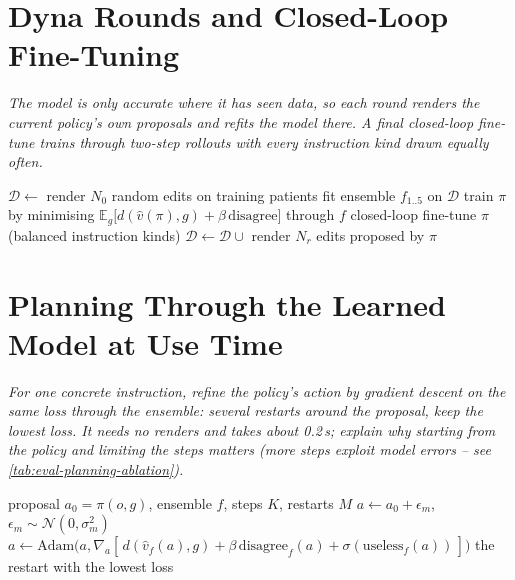 \documentclass[12pt, a4paper]{book}
\newcommand{\plan}[1]{{\color{gray}\itshape #1\par}}
\begin{document}
\section{Dyna Rounds and Closed-Loop Fine-Tuning}
\label{sec:method-dyna}
\plan{The model is only accurate where it has seen data, so each round renders the current policy's own proposals and refits the model there. A final closed-loop fine-tune trains through two-step rollouts with every instruction kind drawn equally often.}

\begin{algorithm}[ht]
  \caption{Model-based training with Dyna rounds}
  \label{alg:dyna}
  \begin{algorithmic}[1]
    \State $\mathcal{D} \gets$ render $N_0$ random edits on training patients
      \State fit ensemble $f_{1..5}$ on $\mathcal{D}$
      \State train $\pi$ by minimising $\mathbb{E}_{g}\big[d(\hat v(\pi), g) + \beta\,\mathrm{disagree}\big]$ through $f$
       \State closed-loop fine-tune $\pi$ (balanced instruction kinds) \EndIf
      \State $\mathcal{D} \gets \mathcal{D} \cup$ render $N_r$ edits proposed by $\pi$
    \EndFor
  \end{algorithmic}
\end{algorithm}

\section{Planning Through the Learned Model at Use Time}
\label{sec:method-planning}
\plan{For one concrete instruction, refine the policy's action by gradient descent on the same loss through the ensemble: several restarts around the proposal, keep the lowest loss. It needs no renders and takes about 0.2\,s; explain why starting from the policy and limiting the steps matters (more steps exploit model errors -- see \cref{tab:eval-planning-ablation}).}

\begin{algorithm}[ht]
  \caption{Planning a residual action through the dynamics ensemble}
  \label{alg:plan}
  \begin{algorithmic}[1]
    \Require proposal $a_0 = \pi(o, g)$, ensemble $f$, steps $K$, restarts $M$
      \State $a \gets a_0 + \epsilon_m$, \quad $\epsilon_m \sim \mathcal{N}(0, \sigma_m^2)$
        \State $a \gets \mathrm{Adam}\big(a, \nabla_a [\,d(\hat v_f(a), g) + \beta\,\mathrm{disagree}_f(a) + \sigma(\mathrm{useless}_f(a))\,]\big)$
      \EndFor
    \EndFor
    \State \Return the restart with the lowest loss
  \end{algorithmic}
\end{algorithm}
\end{document}
